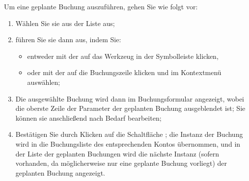 Um eine geplante Buchung auszuführen, gehen Sie wie folgt vor:
\begin{enumerate}
	\item Wählen Sie sie aus der Liste aus;
	\item führen Sie sie dann aus, indem Sie:
	\begin{itemize}
		\item entweder mit der  auf das Werkzeug  in der Symbolleiste klicken,
		\item oder mit der  auf die Buchungszeile klicken und im Kontextmenü  auswählen;
	\end{itemize}
	\item Die ausgewählte Buchung wird dann im Buchungsformular angezeigt, wobei die oberste Zeile der Parameter der geplanten Buchung ausgeblendet ist; Sie können sie anschließend nach Bedarf bearbeiten;
	\item Bestätigen Sie durch Klicken auf die Schaltfläche ; die Instanz der Buchung wird in die Buchungsliste des entsprechenden Kontos übernommen, und in der Liste der geplanten Buchungen wird die nächste Instanz (sofern vorhanden, da möglicherweise nur eine geplante Buchung vorliegt) der geplanten Buchung angezeigt.

\end{enumerate}

